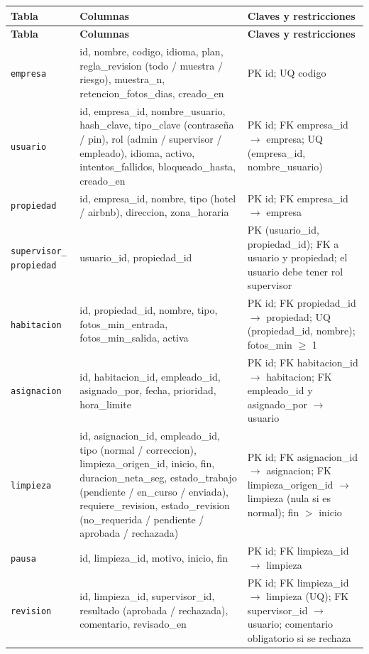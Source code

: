\documentclass[11pt,a4paper]{article}
\begin{document}
{\small
\setlength{\tabcolsep}{4pt}
\begin{longtable}{L{2.9cm} L{6.6cm} L{5.4cm}}
\toprule
\textbf{Tabla} & \textbf{Columnas} & \textbf{Claves y restricciones}\\
\midrule
\endfirsthead
\toprule
\textbf{Tabla} & \textbf{Columnas} & \textbf{Claves y restricciones}\\
\midrule
\endhead
\bottomrule
\endfoot
\texttt{empresa} & id, nombre, codigo, idioma, plan, regla\_revision (todo / muestra / riesgo), muestra\_n, retencion\_fotos\_dias, creado\_en & PK id; UQ codigo\\
\texttt{usuario} & id, empresa\_id, nombre\_usuario, hash\_clave, tipo\_clave (contraseña / pin), rol (admin / supervisor / empleado), idioma, activo, intentos\_fallidos, bloqueado\_hasta, creado\_en & PK id; FK empresa\_id $\rightarrow$ empresa; UQ (empresa\_id, nombre\_usuario)\\
\texttt{propiedad} & id, empresa\_id, nombre, tipo (hotel / airbnb), direccion, zona\_horaria & PK id; FK empresa\_id $\rightarrow$ empresa\\
\texttt{supervisor\_ propiedad} & usuario\_id, propiedad\_id & PK (usuario\_id, propiedad\_id); FK a usuario y propiedad; el usuario debe tener rol supervisor\\
\texttt{habitacion} & id, propiedad\_id, nombre, tipo, fotos\_min\_entrada, fotos\_min\_salida, activa & PK id; FK propiedad\_id $\rightarrow$ propiedad; UQ (propiedad\_id, nombre); fotos\_min $\geq$ 1\\
\texttt{asignacion} & id, habitacion\_id, empleado\_id, asignado\_por, fecha, prioridad, hora\_limite & PK id; FK habitacion\_id $\rightarrow$ habitacion; FK empleado\_id y asignado\_por $\rightarrow$ usuario\\
\texttt{limpieza} & id, asignacion\_id, empleado\_id, tipo (normal / correccion), limpieza\_origen\_id, inicio, fin, duracion\_neta\_seg, estado\_trabajo (pendiente / en\_curso / enviada), requiere\_revision, estado\_revision (no\_requerida / pendiente / aprobada / rechazada) & PK id; FK asignacion\_id $\rightarrow$ asignacion; FK limpieza\_origen\_id $\rightarrow$ limpieza (nula si es normal); fin $>$ inicio\\
\texttt{pausa} & id, limpieza\_id, motivo, inicio, fin & PK id; FK limpieza\_id $\rightarrow$ limpieza\\
\texttt{revision} & id, limpieza\_id, supervisor\_id, resultado (aprobada / rechazada), comentario, revisado\_en & PK id; FK limpieza\_id $\rightarrow$ limpieza (UQ); FK supervisor\_id $\rightarrow$ usuario; comentario obligatorio si se rechaza\\

\end{longtable}}
\end{document}

